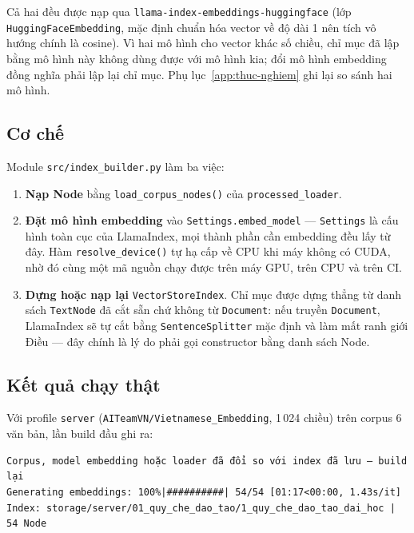 Cả hai đều được nạp qua \texttt{llama-index-embeddings-huggingface} (lớp \texttt{HuggingFaceEmbedding}, mặc định chuẩn hóa vector về độ dài 1 nên tích vô hướng chính là cosine). Vì hai mô hình cho vector khác số chiều, chỉ mục đã lập bằng mô hình này không dùng được với mô hình kia; đổi mô hình embedding đồng nghĩa phải lập lại chỉ mục. Phụ lục~\ref{app:thuc-nghiem} ghi lại so sánh hai mô hình.

\subsection{Cơ chế}

Module \texttt{src/index\_builder.py} làm ba việc:

\begin{enumerate}
  \item \textbf{Nạp Node} bằng \texttt{load\_corpus\_nodes()} của \texttt{processed\_loader}.
  \item \textbf{Đặt mô hình embedding} vào \texttt{Settings.embed\_model} --- \texttt{Settings} là
        cấu hình toàn cục của LlamaIndex, mọi thành phần cần embedding đều lấy từ đây. Hàm
        \texttt{resolve\_device()} tự hạ cấp về CPU khi máy không có CUDA, nhờ đó cùng một mã nguồn
        chạy được trên máy GPU, trên CPU và trên CI.
  \item \textbf{Dựng hoặc nạp lại} \texttt{VectorStoreIndex}. Chỉ mục được dựng thẳng từ danh sách
        \texttt{TextNode} đã cắt sẵn chứ không từ \texttt{Document}: nếu truyền \texttt{Document},
        LlamaIndex sẽ tự cắt bằng \texttt{SentenceSplitter} mặc định và làm mất ranh giới Điều ---
        đây chính là lý do phải gọi constructor bằng danh sách Node.
\end{enumerate}

\subsection{Kết quả chạy thật}

Với profile \texttt{server} (\texttt{AITeamVN/Vietnamese\_Embedding}, 1\,024 chiều) trên corpus 6
văn bản, lần build đầu ghi ra:

\begin{lstlisting}[caption={Dòng log khi build lại chỉ mục (đo trên CPU).}, label={lst:index-output}]
Corpus, model embedding hoặc loader đã đổi so với index đã lưu — build lại
Generating embeddings: 100%|##########| 54/54 [01:17<00:00, 1.43s/it]
Index: storage/server/01_quy_che_dao_tao/1_quy_che_dao_tao_dai_hoc | 54 Node
\end{lstlisting}

